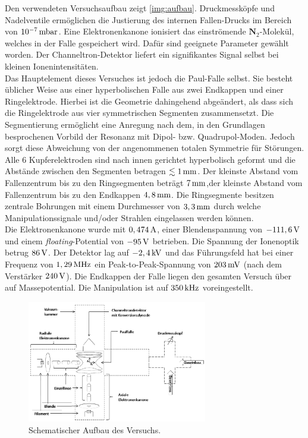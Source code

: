 \documentclass[numbers=noenddot,a4paper,notitlepage,twoside,BCOR15mm]{scrartcl}
\newcommand{\tenpo}[1]{ 10^{#1}}
\newcommand{\tilt}[1]{\textit{#1}}
\newcommand{\fett}[1]{\textbf{#1}}
\begin{document}
		Den verwendeten Versuchsaufbau zeigt \autoref{img:aufbau}. Druckmessköpfe und Nadelventile ermöglichen die Justierung des internen Fallen-Drucks im Bereich von $\unit[\tenpo{-7}]{mbar}$. Eine Elektronenkanone ionisiert das einströmende $\fett{N}_2$-Molekül, welches in der Falle gespeichert wird. Dafür sind geeignete Parameter gewählt worden. Der Channeltron-Detektor liefert ein signifikantes Signal selbst bei kleinen Ionenintensitäten.\\
		Das Hauptelement dieses Versuches ist jedoch die Paul-Falle selbst. Sie besteht üblicher Weise aus einer hyperbolischen Falle aus zwei Endkappen und einer Ringelektrode. Hierbei ist die Geometrie dahingehend abgeändert, als dass sich die Ringelektrode aus vier symmetrischen Segmenten zusammensetzt. Die Segmentierung ermöglicht eine Anregung nach dem, in den Grundlagen besprochenen Vorbild der Resonanz mit Dipol- bzw. Quadrupol-Moden. Jedoch sorgt diese Abweichung von der angenommenen totalen Symmetrie für Störungen.\\
		Alle 6 Kupferelektroden sind nach innen gerichtet hyperbolisch geformt und die Abstände zwischen den Segmenten betragen $\lesssim\unit[1]{mm}$. Der kleinste Abstand vom Fallenzentrum bis zu den Ringsegmenten beträgt $\unit[7]{mm}$,der kleinste Abstand vom Fallenzentrum bis zu den Endkappen $\unit[4,8]{mm}$. Die Ringsegmente besitzen zentrale Bohrungen mit einem Durchmesser von $\unit[3,3]{mm}$ durch welche Manipulationssignale und/oder Strahlen eingelassen werden können.\\
		Die Elektronenkanone wurde mit $\unit[0,474]{A}$, einer Blendenspannung von $\unit[-111,6]{V}$ und einem \tilt{floating}-Potential von $\unit[-95]{V}$ betrieben. Die Spannung der Ionenoptik betrug $\unit[86]{V}$. Der Detektor lag auf $\unit[-2,4]{kV}$ und das Führungsfeld hat bei einer Frequenz von $\unit[1,29]{MHz}$ ein Peak-to-Peak-Spannung von $\unit[203]{mV}$ (nach dem Verstärker $\unit[240]{V}$). Die Endkappen der Falle liegen den gesamten Versuch über auf Massepotential. Die Manipulation ist auf $\unit[350]{kHz}$ voreingestellt.

			\begin{figure}
				\centering
				\includegraphics[width=0.7\textwidth]{aufbau.png}
				\caption{Schematischer Aufbau des Versuchs. \cite{EMAUGreifswaldPaul}}\label{img:aufbau}
			\end{figure}
\end{document}
